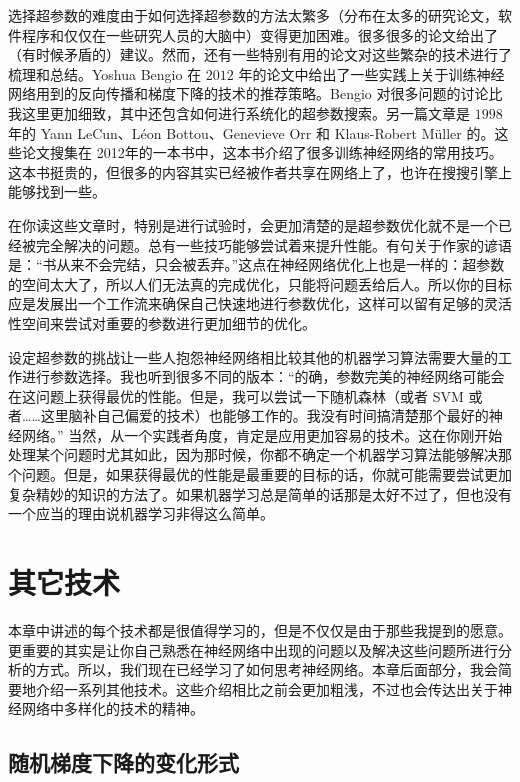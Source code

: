 选择超参数的难度由于如何选择超参数的方法太繁多（分布在太多的研究论文，软件程序和仅仅在一些研究人员的大脑中）变得更加困难。很多很多的论文给出了（有时候矛盾的）建议。然而，还有一些特别有用的论文对这些繁杂的技术进行了梳理和总结。Yoshua Bengio 在 $2012$ 年的论文中给出了一些实践上关于训练神经网络用到的反向传播和梯度下降的技术的推荐策略。Bengio 对很多问题的讨论比我这里更加细致，其中还包含如何进行系统化的超参数搜索。另一篇文章是 $1998$ 年的 Yann LeCun、Léon Bottou、Genevieve Orr 和 Klaus-Robert Müller 的。这些论文搜集在 2012年的一本书中，这本书介绍了很多训练神经网络的常用技巧。这本书挺贵的，但很多的内容其实已经被作者共享在网络上了，也许在搜搜引擎上能够找到一些。

在你读这些文章时，特别是进行试验时，会更加清楚的是超参数优化就不是一个已经被完全解决的问题。总有一些技巧能够尝试着来提升性能。有句关于作家的谚语是：“书从来不会完结，只会被丢弃。”这点在神经网络优化上也是一样的：超参数的空间太大了，所以人们无法真的完成优化，只能将问题丢给后人。所以你的目标应是发展出一个工作流来确保自己快速地进行参数优化，这样可以留有足够的灵活性空间来尝试对重要的参数进行更加细节的优化。

设定超参数的挑战让一些人抱怨神经网络相比较其他的机器学习算法需要大量的工作进行参数选择。我也听到很多不同的版本：“的确，参数完美的神经网络可能会在这问题上获得最优的性能。但是，我可以尝试一下随机森林（或者 SVM 或者……这里脑补自己偏爱的技术）也能够工作的。我没有时间搞清楚那个最好的神经网络。” 当然，从一个实践者角度，肯定是应用更加容易的技术。这在你刚开始处理某个问题时尤其如此，因为那时候，你都不确定一个机器学习算法能够解决那个问题。但是，如果获得最优的性能是最重要的目标的话，你就可能需要尝试更加复杂精妙的知识的方法了。如果机器学习总是简单的话那是太好不过了，但也没有一个应当的理由说机器学习非得这么简单。

\section{其它技术}
\label{sec:other_techniques}

本章中讲述的每个技术都是很值得学习的，但是不仅仅是由于那些我提到的愿意。更重要的其实是让你自己熟悉在神经网络中出现的问题以及解决这些问题所进行分析的方式。所以，我们现在已经学习了如何思考神经网络。本章后面部分，我会简要地介绍一系列其他技术。这些介绍相比之前会更加粗浅，不过也会传达出关于神经网络中多样化的技术的精神。

\subsection{随机梯度下降的变化形式}

